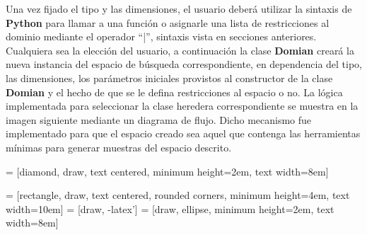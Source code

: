 Una vez fijado el tipo y las dimensiones, el usuario deberá utilizar la sintaxis de {\bf Python} para llamar a una función
o asignarle una lista de restricciones al dominio mediante el operador ``|'', sintaxis vista en secciones anteriores.
Cualquiera sea la elección del usuario, a continuación la clase  {\bf Domian}  creará la nueva instancia del espacio de
búsqueda correspondiente, en dependencia del tipo, las dimensiones, los parámetros iniciales provistos al constructor
de la clase  {\bf Domian}  y el hecho de que se le defina restricciones al espacio o no. La lógica implementada para seleccionar
la clase heredera correspondiente se muestra en la imagen siguiente mediante un diagrama de flujo. Dicho mecanismo fue
implementado para que el espacio creado sea aquel que contenga las herramientas mínimas para generar muestras del
espacio descrito.
\newline
\newline



 = [diamond, draw, text centered, minimum height=2em, text width=8em]


 = [rectangle, draw, text centered, rounded corners, minimum height=4em, text width=10em]
 = [draw, -latex']
 = [draw, ellipse, minimum height=2em, text width=8em]


